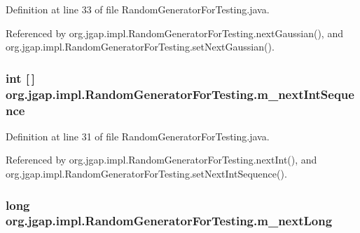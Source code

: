 Definition at line 33 of file Random\-Generator\-For\-Testing.\-java.



Referenced by org.\-jgap.\-impl.\-Random\-Generator\-For\-Testing.\-next\-Gaussian(), and org.\-jgap.\-impl.\-Random\-Generator\-For\-Testing.\-set\-Next\-Gaussian().

\hypertarget{classorg_1_1jgap_1_1impl_1_1_random_generator_for_testing_a2a4c3f020b7f7c46f6bba31cbbb9077c}{
\subsubsection[{m\-\_\-next\-Int\-Sequence}]{\setlength{\rightskip}{0pt plus 5cm}int \mbox{[}$\,$\mbox{]} org.\-jgap.\-impl.\-Random\-Generator\-For\-Testing.\-m\-\_\-next\-Int\-Sequence\hspace{0.3cm}{\ttfamily [private]}}}\label{classorg_1_1jgap_1_1impl_1_1_random_generator_for_testing_a2a4c3f020b7f7c46f6bba31cbbb9077c}


Definition at line 31 of file Random\-Generator\-For\-Testing.\-java.



Referenced by org.\-jgap.\-impl.\-Random\-Generator\-For\-Testing.\-next\-Int(), and org.\-jgap.\-impl.\-Random\-Generator\-For\-Testing.\-set\-Next\-Int\-Sequence().

\hypertarget{classorg_1_1jgap_1_1impl_1_1_random_generator_for_testing_abd5fa434793c41fe1a54972e23e98428}{
\subsubsection[{m\-\_\-next\-Long}]{\setlength{\rightskip}{0pt plus 5cm}long org.\-jgap.\-impl.\-Random\-Generator\-For\-Testing.\-m\-\_\-next\-Long\hspace{0.3cm}{\ttfamily [private]}}}\label{classorg_1_1jgap_1_1impl_1_1_random_generator_for_testing_abd5fa434793c41fe1a54972e23e98428}


